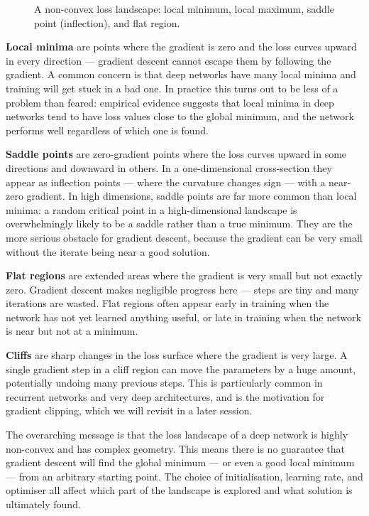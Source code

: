 \begin{figure}
\centering
{}
\resizebox{0.43\textwidth}{!}{}
\caption{A non-convex loss landscape: local minimum, local maximum, saddle point (inflection), and flat region.}
\label{fig:loss_landscape_features}
\end{figure}

\textbf{Local minima} are points where the gradient is zero and the loss curves upward in every direction — gradient descent cannot escape them by following the gradient. A common concern is that deep networks have many local minima and training will get stuck in a bad one. In practice this turns out to be less of a problem than feared: empirical evidence suggests that local minima in deep networks tend to have loss values close to the global minimum, and the network performs well regardless of which one is found.

\textbf{Saddle points} are zero-gradient points where the loss curves upward in some directions and downward in others. In a one-dimensional cross-section they appear as inflection points — where the curvature changes sign — with a near-zero gradient. In high dimensions, saddle points are far more common than local minima: a random critical point in a high-dimensional landscape is overwhelmingly likely to be a saddle rather than a true minimum. They are the more serious obstacle for gradient descent, because the gradient can be very small without the iterate being near a good solution.

\textbf{Flat regions} are extended areas where the gradient is very small but not exactly zero. Gradient descent makes negligible progress here — steps are tiny and many iterations are wasted. Flat regions often appear early in training when the network has not yet learned anything useful, or late in training when the network is near but not at a minimum.

\textbf{Cliffs} are sharp changes in the loss surface where the gradient is very large. A single gradient step in a cliff region can move the parameters by a huge amount, potentially undoing many previous steps. This is particularly common in recurrent networks and very deep architectures, and is the motivation for gradient clipping, which we will revisit in a later session.

The overarching message is that the loss landscape of a deep network is highly non-convex and has complex geometry. This means there is no guarantee that gradient descent will find the global minimum — or even a good local minimum — from an arbitrary starting point. The choice of initialisation, learning rate, and optimiser all affect which part of the landscape is explored and what solution is ultimately found.

